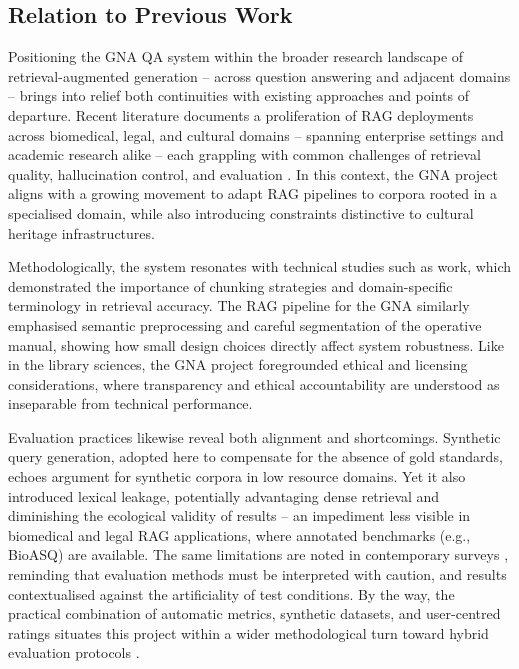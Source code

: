 \begin{spacing}{1.5}
\section{Relation to Previous Work}
Positioning the GNA QA system within the broader research landscape of retrieval-augmented generation -- across question answering and adjacent domains -- brings into relief both continuities with existing approaches and points of departure. Recent literature documents a proliferation of RAG deployments across biomedical, legal, and cultural domains -- spanning enterprise settings and academic research alike -- each grappling with common challenges of retrieval quality, hallucination control, and evaluation \citep{agarwal_litllm_2025,bevara_prospects_2025,soman_observations_2024}. In this context, the GNA project aligns with a growing movement to adapt RAG pipelines to corpora rooted in a specialised domain, while also introducing constraints distinctive to cultural heritage infrastructures.

Methodologically, the system resonates with technical studies such as \citet{soman_observations_2024} work, which demonstrated the importance of chunking strategies and domain-specific terminology in retrieval accuracy. The RAG pipeline for the GNA similarly emphasised semantic preprocessing and careful segmentation of the operative manual, showing how small design choices directly affect system robustness. Like \citet{bevara_prospects_2025} in the library sciences, the GNA project foregrounded ethical and licensing considerations, where transparency and ethical accountability are understood as inseparable from technical performance.

Evaluation practices likewise reveal both alignment and shortcomings. Synthetic query generation, adopted here to compensate for the absence of gold standards, echoes \citet{bor-woei_generative_2024} argument for synthetic corpora in low resource domains. Yet it also introduced lexical leakage, potentially advantaging dense retrieval and diminishing the ecological validity of results -- an impediment less visible in biomedical and legal RAG applications, where annotated benchmarks (e.g., BioASQ) are available. The same limitations are noted in contemporary surveys \citep{yue_survey_2025}, reminding that evaluation methods must be interpreted with caution, and results contextualised against the artificiality of test conditions. By the way, the practical combination of automatic metrics, synthetic datasets, and user-centred ratings situates this project within a wider methodological turn toward hybrid evaluation protocols \citep{abeysinghe_challenges_2024,gupta_comprehensive_2024}.


\end{spacing}
